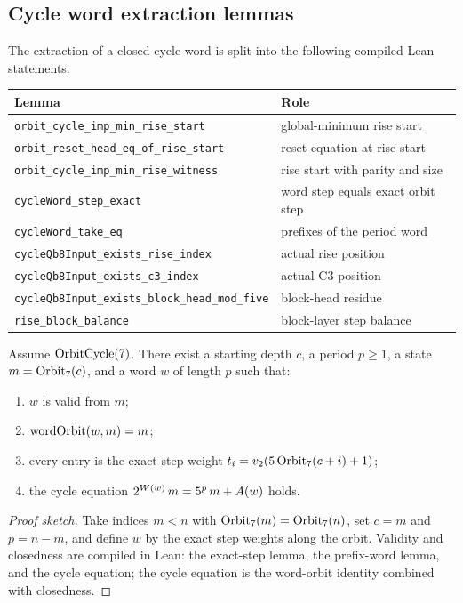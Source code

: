 \subsection{Cycle word extraction lemmas}

The extraction of a closed cycle word is split into the following
compiled Lean statements.

\begin{center}
\begin{tabular}{ll}
\toprule
Lemma & Role \\
\midrule
\texttt{orbit\_cycle\_imp\_min\_rise\_start} & global-minimum rise start \\
\texttt{orbit\_reset\_head\_eq\_of\_rise\_start} & reset equation at rise start \\
\texttt{orbit\_cycle\_imp\_min\_rise\_witness} & rise start with parity and size \\
\texttt{cycleWord\_step\_exact} & word step equals exact orbit step \\
\texttt{cycleWord\_take\_eq} & prefixes of the period word \\
\texttt{cycleQb8Input\_exists\_rise\_index} & actual rise position \\
\texttt{cycleQb8Input\_exists\_c3\_index} & actual C3 position \\
\texttt{cycleQb8Input\_exists\_block\_head\_mod\_five} & block-head residue \\
\texttt{rise\_block\_balance} & block-layer step balance \\
\bottomrule
\end{tabular}
\end{center}

\begin{proposition}\label{prop:cycle-word}
Assume $\mathrm{OrbitCycle}(7)$.  There exist a starting depth $c$, a period
$p\ge1$, a state $m=\mathrm{Orbit}_7(c)$, and a word $w$ of length $p$ such
that:
\begin{enumerate}[leftmargin=*]
\item $w$ is valid from $m$;
\item $\mathrm{wordOrbit}(w,m)=m$;
\item every entry is the exact step weight
  $t_i=v_2\!\left(5\,\mathrm{Orbit}_7(c+i)+1\right)$;
\item the cycle equation $2^{W(w)}\,m=5^p\,m+A(w)$
  holds.
\end{enumerate}
\end{proposition}

\begin{proof}[Proof sketch]
Take indices $m<n$ with $\mathrm{Orbit}_7(m)=\mathrm{Orbit}_7(n)$, set $c=m$ and
$p=n-m$, and define $w$ by the exact step weights along the orbit.
Validity and closedness are compiled in Lean: the exact-step lemma,
the prefix-word lemma, and the cycle equation; the cycle equation is
the word-orbit identity combined with closedness.
\end{proof}

